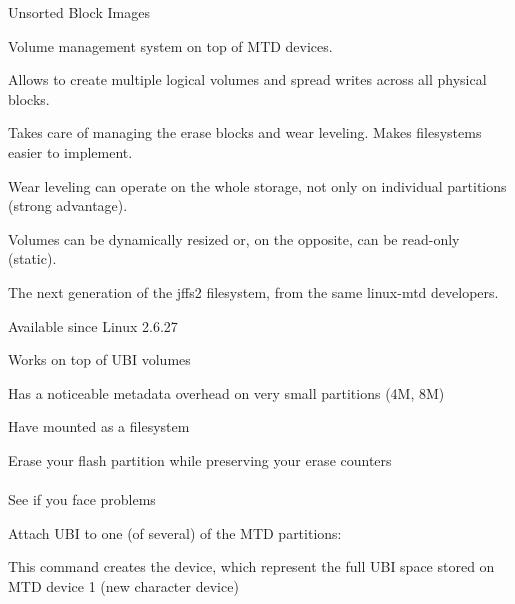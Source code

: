   Unsorted Block Images
  \startitemize
  \item {}
  \item Volume management system on top of MTD devices.
  \item Allows to create multiple logical volumes and spread writes
    across all physical blocks.
  \item Takes care of managing the erase blocks and wear
    leveling. Makes filesystems easier to implement.
  \item Wear leveling can operate on the whole storage,
    not only on individual partitions (strong advantage). 
  \item Volumes can be dynamically resized or, on the opposite, can be
    read-only (static).
  \stopitemize




    \startitemize
    \item The next generation of the jffs2 filesystem, from the same
      linux-mtd developers.
    \item Available since Linux 2.6.27
    \item Works on top of UBI volumes
    \item Has a noticeable metadata overhead on very small partitions
      (4M, 8M)
    \stopitemize


  \startitemize
  \item Have  mounted as a  filesystem
  \item Erase your flash partition while preserving your erase counters\\
    \\
    See  if you
    face problems
  \item Attach UBI to one (of several) of the MTD partitions:\\
  \item This command creates the  device, which represent
    the full UBI space stored on MTD device 1 (new 
    character device)
  \stopitemize


